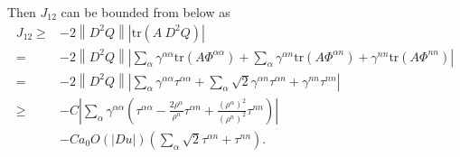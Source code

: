 \documentclass[12pt]{article}
\numberwithin{equation}{section}
\theoremstyle{plain}
\theoremstyle{definition}
\theoremstyle{remark}
\begin{document}
Then $J_{12}$ can be bounded from below as
\begin{equation} \label{eq:neuJ1_2}
\begin{split}
    J_{12}   \geq &-2 \left\| D^2 Q \right\|  \left|\text{tr}(A \  D^2 Q)  \right| \\
     = & -2 \left\| D^2 Q \right\| \left|  \sum_{\alpha} \gamma^{\alpha \alpha} \text{tr}(A\Phi^{\alpha \alpha}) +  \sum_{\alpha} \gamma^{\alpha n} \text{tr}(A\Phi^{\alpha n}) + \gamma^{n n} \text{tr}(A\Phi^{n n})  \right| \\
     = & -2 \left\| D^2 Q \right\| \left|  \sum_{\alpha} \gamma^{\alpha \alpha} \tau^{\alpha \alpha} +  \sum_{\alpha} \sqrt{2} \gamma^{\alpha n} \tau^{\alpha n} + \gamma^{n n} \tau^{n n}  \right| \\
     \geq & -C \left|\sum_{\alpha} \gamma^{\alpha \alpha} \left(   \tau^{\alpha \alpha}  -   \frac{2\rho^{\alpha}}{\rho^n}  \tau^{\alpha n} +  \frac{(\rho^{\alpha})^2}{(\rho^n)^2}  \tau^{n n} \right) \right| \\
    &   -C  a_0 O\left( |Du| \right) \left(\sum_{\alpha} \sqrt{2} \tau^{\alpha n} + \tau^{n n} \right).
\end{split}
\end{equation}
\end{document}
